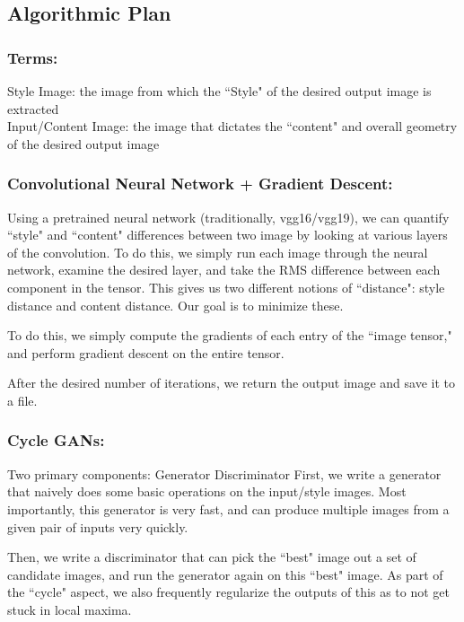 \documentclass[12pt]{article}
\begin{document}
\subsection{Algorithmic Plan}

    \subsubsection{Terms:}
    Style Image: the image from which the ``Style" of the desired output image is extracted\\
    Input/Content Image: the image that dictates the ``content" and overall geometry of the desired output image\\

    \subsubsection{Convolutional Neural Network + Gradient Descent:}
    Using a pretrained neural network (traditionally, vgg16/vgg19), we can quantify ``style" and ``content" differences between two image by looking at various layers of the convolution. To do this, we simply run each image through the neural network, examine the desired layer, and take the RMS difference between each component in the tensor. 
    This gives us two different notions of ``distance": style distance and content distance. Our goal is to minimize these. 

    To do this, we simply compute the gradients of each entry of the ``image tensor," and perform gradient descent on the entire tensor. 

    After the desired number of iterations, we return the output image and save it to a file.

    \subsubsection{Cycle GANs:}
    Two primary components:
    Generator 
    Discriminator
    First, we write a generator that naively does some basic operations on the input/style images. Most importantly, this generator is very fast, and can produce multiple images from a given pair of inputs very quickly. 

    Then, we write a discriminator that can pick the ``best" image out a set of candidate images, and run the generator again on this ``best" image. As part of the ``cycle" aspect, we also frequently regularize the outputs of this as to not get stuck in local maxima. 
\end{document}
